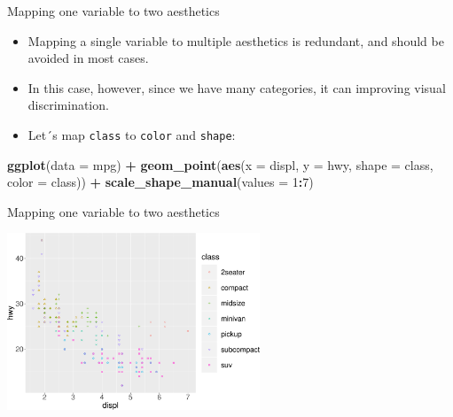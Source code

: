 \documentclass[ignorenonframetext,]{beamer}
\newenvironment{Shaded}{\begin{snugshade}}{\end{snugshade}}
\newcommand{\DataTypeTok}[1]{\textcolor[rgb]{0.13,0.29,0.53}{#1}}
\newcommand{\DecValTok}[1]{\textcolor[rgb]{0.00,0.00,0.81}{#1}}
\newcommand{\KeywordTok}[1]{\textcolor[rgb]{0.13,0.29,0.53}{\textbf{#1}}}
\newcommand{\NormalTok}[1]{#1}
\newcommand{\OperatorTok}[1]{\textcolor[rgb]{0.81,0.36,0.00}{\textbf{#1}}}
\newcommand{\StringTok}[1]{\textcolor[rgb]{0.31,0.60,0.02}{#1}}
\begin{document}
\begin{frame}[fragile]{Mapping one variable to two aesthetics}
\protect\hypertarget{mapping-one-variable-to-two-aesthetics}{}

\begin{itemize}
\item
  Mapping a single variable to multiple aesthetics is redundant, and
  should be avoided in most cases.
\item
  In this case, however, since we have many categories, it can improving
  visual discrimination.
\item
  Let´s map \texttt{class} to \texttt{color} and \texttt{shape}:
\end{itemize}

\begin{Shaded}
\begin{Highlighting}[]
\KeywordTok{ggplot}\NormalTok{(}\DataTypeTok{data =}\NormalTok{ mpg) }\OperatorTok{+}
\StringTok{  }\KeywordTok{geom_point}\NormalTok{(}\KeywordTok{aes}\NormalTok{(}\DataTypeTok{x =}\NormalTok{ displ, }\DataTypeTok{y =}\NormalTok{ hwy, }
                 \DataTypeTok{shape =}\NormalTok{ class, }\DataTypeTok{color =}\NormalTok{ class)) }\OperatorTok{+}
\StringTok{  }\KeywordTok{scale_shape_manual}\NormalTok{(}\DataTypeTok{values =} \DecValTok{1}\OperatorTok{:}\DecValTok{7}\NormalTok{)}
\end{Highlighting}
\end{Shaded}

\end{frame}

\begin{frame}{Mapping one variable to two aesthetics}
\protect\hypertarget{mapping-one-variable-to-two-aesthetics-1}{}

\begin{center}\includegraphics[height=200px]{data-visualization_files/figure-beamer/unnamed-chunk-20-1} \end{center}

\end{frame}
\end{document}
